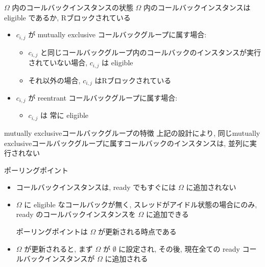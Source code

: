 \begin{frame}{$\Omega$ 内のコールバックインスタンスの状態}
    $\Omega$ 内のコールバックインスタンスは eligible であるか, Rブロックされている
    \begin{itemize}
        \item $c_{i, j}$ が mutually exclusive コールバックグループに属す場合:
              \begin{itemize}
                  \item $c_{i, j}$ と同じコールバックグループ内のコールバックのインスタンスが実行されていない場合, $c_{i, j}$ は eligible
                  \item それ以外の場合, $c_{i, j}$ はRブロックされている
              \end{itemize}
        \item $c_{i, j}$ が reentrant コールバックグループに属す場合:
              \begin{itemize}
                  \item $c_{i, j}$ は 常に eligible
              \end{itemize}
    \end{itemize}
\end{frame}

\begin{frame}{mutually exclusiveコールバックグループの特徴}
    上記の設計により, 同じmutually exclusiveコールバックグループに属すコールバックのインスタンスは, 並列に実行されない
\end{frame}


\begin{frame}{ポーリングポイント}
    \begin{itemize}
        \item コールバックインスタンスは, ready でもすぐには $\Omega$ に追加されない
        \item $\Omega$ に eligible なコールバックが無く, スレッドがアイドル状態の場合にのみ, ready のコールバックインスタンスを $\Omega$ に追加できる
              \begin{definition}[ポーリングポイント]
                  ポーリングポイントは $\Omega$ が更新される時点である
              \end{definition}
              \vspace{3mm}
        \item $\Omega$ が更新されると, まず $\Omega$ が $\emptyset$ に設定され, その後, 現在全ての ready コールバックインスタンスが $\Omega$ に追加される
    \end{itemize}
\end{frame}

